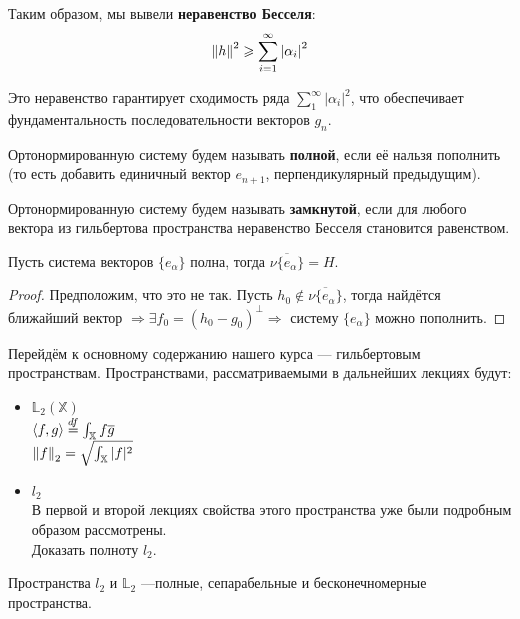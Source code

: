 \documentclass[12pt]{article}
\begin{document}
	
	Таким образом, мы вывели \textbf{неравенство Бесселя}:
	$$ \left\| h \right\|^2 \geqslant \sum_{i=1}^{\infty} \left| \alpha_i \right|^2 $$

	Это неравенство гарантирует сходимость ряда $\sum_1^{\infty} |\alpha_i|^2$, что обеспечивает фундаментальность 
	последовательности векторов $g_n$.
	
	\begin{defi}
		Ортонормированную систему будем называть \textbf{полной}, если её нальзя пополнить 
		(то есть добавить единичный вектор $e_{n+1}$, перпендикулярный предыдущим).
	\end{defi}
	\begin{defi}
		Ортонормированную систему будем называть \textbf{замкнутой}, если для любого вектора из 
		гильбертова пространства неравенство Бесселя становится равенством.
	\end{defi}
	
	\begin{state}
		Пусть система векторов $\{ e_\alpha \}$ полна, тогда $\overline{ \nu \{ e_\alpha \} } = H$.
	\end{state}
	\begin{proof}
		Предположим, что это не так. Пусть $h_0 \notin \overline{ \nu \{ e_\alpha \} }$, тогда найдётся ближайший вектор $\Rightarrow 
		\exists f_0 	= (h_0 - g_0)^\perp	\Rightarrow$ систему $\{ e_{\alpha} \}$ можно пополнить.
	\end{proof}
	


	Перейдём к основному содержанию нашего курса --- гильбертовым пространствам. Пространствами, рассматриваемыми 
	в дальнейших лекциях будут:
	\begin{itemize}
		\item $\mathbb{L}_2(\mathbb{X})$ \\
		$\left\langle f, g \right\rangle \overset{df}{=} \int_{\mathbb{X}} f\overline{g}$ \\
		$\left\| f \right\|_2 = \sqrt{\int_{\mathbb{X}} |f|^2}$ \\
		
		\item $l_2$ \\
		В первой и второй лекциях свойства этого пространства уже были подробным образом рассмотрены. \\
		\exc Доказать полноту $l_2$.
	\end{itemize}
	Пространства $l_2$ и $\mathbb{L}_2$ ---полные, сепарабельные и бесконечномерные пространства.
	
\end{document}
